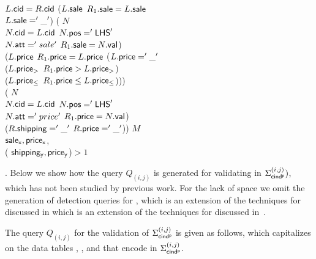 {\begin{example}
\begin{footnotesize}
{ \>  $L.\protect\mathsf{cid}=R.\protect\mathsf{cid}$  ($L.\protect\mathsf{sale}$  $R_1.\protect\mathsf{sale}=L.\protect\mathsf{sale}$\\
 \> \>  $L.\protect\mathsf{sale}='\_'$)  (  $N$\\
 \> \> \>  $N.\protect\mathsf{cid}=L.\protect\mathsf{cid}$  $N.\protect\mathsf{pos}='{\mathsf{LHS}}'$  \\
 \> \> \> $N.\protect\mathsf{att}='sale'$  $R_{1}.\protect\mathsf{sale}=N.\protect\mathsf{val}$)  \\
 \>\> ($L.\protect\mathsf{price}$  $R_1.\protect\mathsf{price}=L.\protect\mathsf{price}$  ($L.\protect\mathsf{price}='\_'$  \\
 \> \>  ($L.\protect\mathsf{price_>}$  $R_1.\protect\mathsf{price}>L.\protect\mathsf{price_>}$)  \\
 \> \>  ($L.\protect\mathsf{price_\leq}$  $R_1.\protect\mathsf{price}\leq L.\protect\mathsf{price_\leq}$))) \\
 \> \>  ( $N$ \\
 \>\>\>  $N.\protect\mathsf{cid}=L.\protect\mathsf{cid}$  $N.\protect\mathsf{pos}='{\mathsf{LHS}}'$  \\
 \> \> \> $N.\protect\mathsf{att}='price'$  $R_{1}.\protect\mathsf{price}=N.\protect\mathsf{val}$) \\

 \> \> ($R.\protect\mathsf{shipping}='\_'$ $R.\protect\mathsf{price}='\_'$))  $M$ \\
 \> \>  $\protect\mathsf{sale_x}, \protect\mathsf{price_x}$,  \\
 \> \> \>  ( $\protect\mathsf{shipping_y}, \protect\mathsf{price_y}$)$>1$ }
\end{footnotesize}

\end{example}


}%

. Below we show how the \SQL query $Q_{(i,j)}$ is generated for
validating \pCINDs in $\Sigma_{{\mathsf{cind^p}}}^{(i,j)})$, which has not been studied
by previous work. For the lack of space we omit the generation of detection queries for \pCFDs, which is an extension of
the \SQL techniques for \CFDs discussed in which is an extension of the
\SQL techniques for \CFDs discussed in~\cite{CFDs,icde08}.



The query $Q_{(i,j)}$ for the validation of $\Sigma_{{\mathsf{cind^p}}}^{(i,j)}$
is given as follows, which capitalizes on the data tables
\Enc{}, ,  and \Enc{\ne} that encode \pCINDs in
$\Sigma_{{\mathsf{cind^p}}}^{(i,j)}$.



